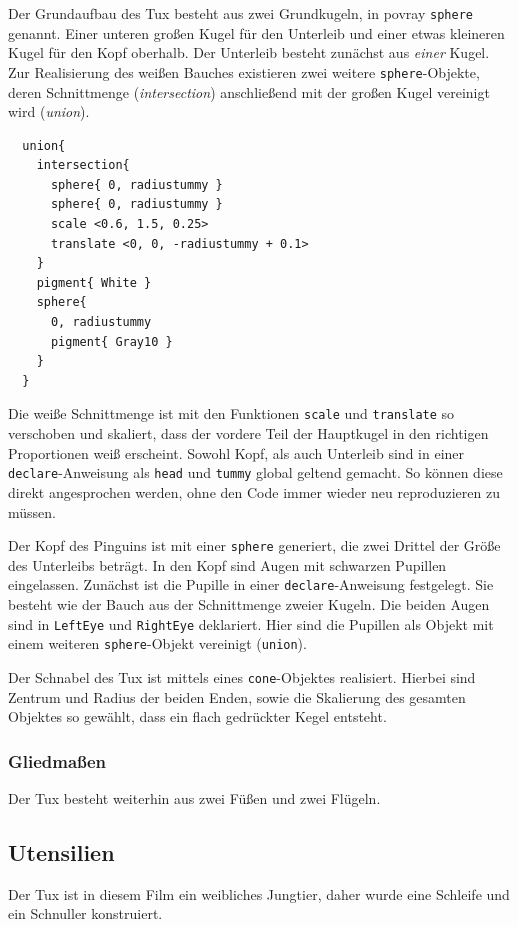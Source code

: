\documentclass[11pt,parskip]{scrartcl}
\begin{document}
Der Grundaufbau des Tux besteht aus zwei Grundkugeln, in povray \texttt{sphere}
genannt. Einer unteren großen Kugel für den Unterleib und einer etwas kleineren
Kugel für den Kopf oberhalb. Der Unterleib besteht zunächst aus \emph{einer}
Kugel. Zur Realisierung des weißen Bauches existieren zwei weitere
\texttt{sphere}-Objekte, deren Schnittmenge (\emph{intersection}) anschließend
mit der großen Kugel vereinigt wird (\emph{union}).
%
\begin{lstlisting}
  union{
    intersection{
      sphere{ 0, radiustummy }
      sphere{ 0, radiustummy }
      scale <0.6, 1.5, 0.25>
      translate <0, 0, -radiustummy + 0.1>
    }
    pigment{ White }
    sphere{
      0, radiustummy
      pigment{ Gray10 }
    }
  }
\end{lstlisting}
%
Die weiße Schnittmenge ist mit den Funktionen \texttt{scale} und
\texttt{translate} so verschoben und skaliert, dass der vordere Teil der
Hauptkugel in den richtigen Proportionen weiß erscheint. Sowohl Kopf, als auch
Unterleib sind in einer \texttt{declare}-Anweisung als \texttt{head} und
\texttt{tummy} global geltend gemacht. So können diese direkt angesprochen
werden, ohne den Code immer wieder neu reproduzieren zu müssen.

Der Kopf des Pinguins ist mit einer \texttt{sphere} generiert, die zwei Drittel
der Größe des Unterleibs beträgt. In den Kopf sind Augen mit schwarzen Pupillen
eingelassen. Zunächst ist die Pupille in einer \texttt{declare}-Anweisung
festgelegt. Sie besteht wie der Bauch aus der Schnittmenge zweier Kugeln. Die
beiden Augen sind in \texttt{LeftEye} und \texttt{RightEye} deklariert. Hier
sind die Pupillen als Objekt mit einem weiteren \texttt{sphere}-Objekt
vereinigt (\texttt{union}).

Der Schnabel des Tux ist mittels eines \texttt{cone}-Objektes realisiert.
Hierbei sind Zentrum und Radius der beiden Enden, sowie die Skalierung des
gesamten Objektes so gewählt, dass ein flach gedrückter Kegel entsteht.

\subsubsection{Gliedmaßen}
Der Tux besteht weiterhin aus zwei Füßen und zwei Flügeln.


\subsection{Utensilien}
Der Tux ist in diesem Film ein weibliches Jungtier, daher wurde eine Schleife
und ein Schnuller konstruiert.
\end{document}
